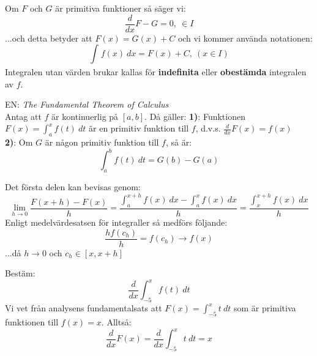 \documentclass{report}
\begin{document}
\noindent
Om $ F $ och $ G $ är primitiva funktioner så säger vi:
\begin{equation*}
\frac{d}{dx} F-G = 0,\: \in I
\end{equation*}
...och detta betyder att $ F(x) = G(x) + C $ och vi kommer använda notationen:
\begin{equation*}
\int_{}^{} f(x) \: dx = F(x) + C, \: ( x \in I)
\end{equation*}
Integralen utan värden brukar kallas för \textbf{indefinita} eller \textbf{obestämda} integralen av $ f $.

{
	EN: \textit{The Fundamental Theorem of Calculus}\\
	Antag att $ f $ är kontinuerlig på $ [a,b] $. Då gäller:
	\textbf{1)}: Funktionen $ F(x) = \int_{a}^{x} f(t) \: dt $ är en primitiv funktion till $ f $, d.v.s. $ \frac{d}{dx} F(x) = f(x) $\\
	\textbf{2)}: Om $ G $ är någon primitiv funktion till $ f $, så är:
\begin{equation*}
\int_{a}^{b} f(t) \: dt = G(b) - G(a)
\end{equation*}

Det första delen kan bevisas genom:
\begin{equation*}
\lim_{h \to 0} \frac{F(x+h)-F(x)}{h}  = \frac{ \int_{a}^{x+h} f(x) \: dx - \int_{a}^{x} f(x) \: dx }{h} = \frac{ \int_{x}^{x+h} f(x) \: dx }{h} 
\end{equation*}
Enligt medelvärdesatsen för integraller så medförs följande:
\begin{equation*}
\frac{hf(c_h)}{h} = f(c_h) \to f(x)
\end{equation*}
...då $ h \to 0 $ och $ c_h \in [x, x+h]$ 
}

\ex{}
{
Bestäm:
\begin{equation*}
\frac{d}{dx} \int_{-5}^{x} f(t) \: dt 
\end{equation*}
Vi vet från analysens fundamentalsats att $ F(x) = \int_{-5}^{x} t \: dt  $ som är primitiva funktionen till $ f(x) = x $. Alltså:
\begin{equation*}
\frac{d}{dx} F(x) = \frac{d}{dx} \int_{-5}^{x} t \: dt = x 
\end{equation*}
}
\end{document}
